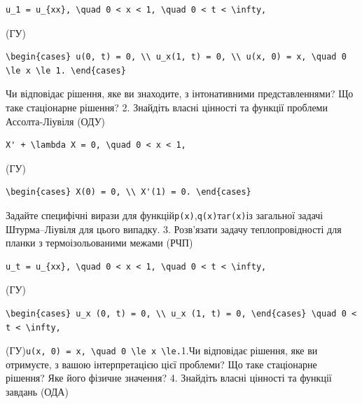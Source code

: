 \documentclass[
  ukrainian,
]{article}
\begin{document}
\begin{verbatim}
u_1 = u_{xx}, \quad 0 < x < 1, \quad 0 < t < \infty,
\end{verbatim}

(ГУ)

\begin{verbatim}
\begin{cases} u(0, t) = 0, \\ u_x(1, t) = 0, \\ u(x, 0) = x, \quad 0 \le x \le 1. \end{cases}
\end{verbatim}

Чи відповідає рішення, яке ви знаходите, з інтонативними
представленнями? Що таке стаціонарне рішення? 2. Знайдіть власні
цінності та функції проблеми Ассолта-Ліувіля (ОДУ)

\begin{verbatim}
X' + \lambda X = 0, \quad 0 < x < 1,
\end{verbatim}

(ГУ)

\begin{verbatim}
\begin{cases} X(0) = 0, \\ X'(1) = 0. \end{cases}
\end{verbatim}

Задайте специфічні вирази для
функцій\texttt{p(x)},\texttt{q(x)}та\texttt{r(x)}із загальної задачі
Штурма--Ліувіля для цього випадку. 3. Розв'язати задачу теплопровідності
для планки з термоізольованими межами (РЧП)

\begin{verbatim}
u_t = u_{xx}, \quad 0 < x < 1, \quad 0 < t < \infty,
\end{verbatim}

(ГУ)

\begin{verbatim}
\begin{cases} u_x (0, t) = 0, \\ u_x (1, t) = 0, \end{cases} \quad 0 < t < \infty,
\end{verbatim}

(ГУ)\texttt{u(x,\ 0)\ =\ x,\ \textbackslash{}quad\ 0\ \textbackslash{}le\ x\ \textbackslash{}le.}1.Чи
відповідає рішення, яке ви отримуєте, з вашою інтерпретацією цієї
проблеми? Що таке стаціонарне рішення? Яке його фізичне значення? 4.
Знайдіть власні цінності та функції завдань (ОДА)
\end{document}
